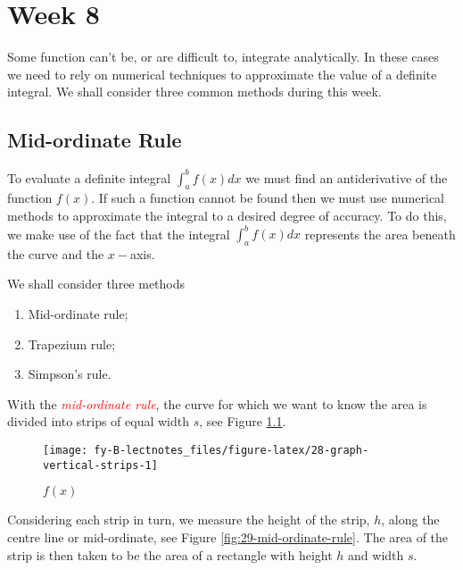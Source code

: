 \documentclass[
  11pt,
  oneside]{book}
\providecommand{\tightlist}{%
  \setlength{\itemsep}{0pt}\setlength{\parskip}{0pt}}
\newcommand{\slide}{}
\theoremstyle{definition}
\theoremstyle{definition}
\theoremstyle{definition}
\theoremstyle{definition}
\theoremstyle{remark}
\begin{document}
\chapter{Week 8}\label{week-eight}

Some function can't be, or are difficult to, integrate analytically. In these cases we need to rely on numerical techniques to approximate the value of a definite integral. We shall consider three common methods during this week.

\slide

\section{Mid-ordinate Rule}\label{mid-ordinate-rule}

To evaluate a definite integral \(\displaystyle\int_a^bf(x)dx\) we must find an antiderivative of the function \(f(x)\). If such a function cannot be found then we must use numerical methods to approximate the integral to a desired degree of accuracy. To do this, we make use of the fact that the integral \(\displaystyle\int_a^bf(x)dx\) represents the area beneath the curve and the \(x-\)axis.

We shall consider three methods

\begin{enumerate}
\def\labelenumi{\arabic{enumi}.}
\tightlist
\item
  Mid-ordinate rule;
\item
  Trapezium rule;
\item
  Simpson's rule.
\end{enumerate}

\slide

With the \textcolor{red}{\em mid-ordinate rule}, the curve for which we want to know the area is divided into strips of equal width \(s\), see Figure \ref{fig:28-graph-vertical-strips}.

\begin{figure}

{\centering \texttt{[image: fy-B-lectnotes\_files/figure-latex/28-graph-vertical-strips-1]} 

}

\caption{$f(x)$}\label{fig:28-graph-vertical-strips}
\end{figure}

Considering each strip in turn, we measure the height of the strip, \(h\), along the centre line or mid-ordinate, see Figure \ref{fig:29-mid-ordinate-rule}. The area of the strip is then taken to be the area of a rectangle with height \(h\) and width \(s\).
\slide
\end{document}
